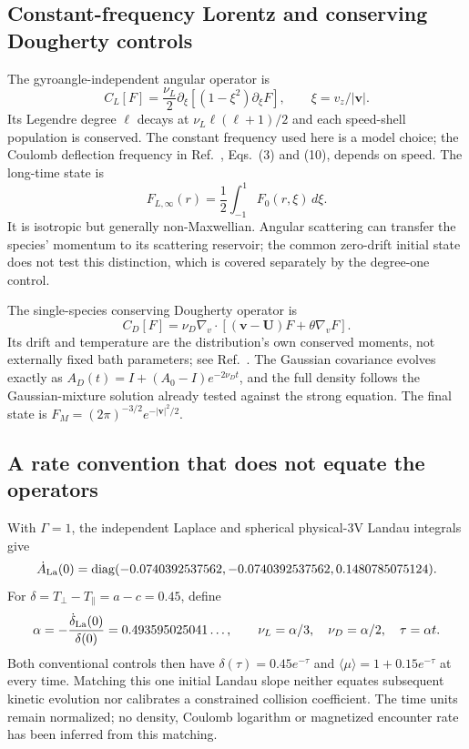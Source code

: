 \documentclass[11pt,letterpaper]{article}
\begin{document}
\subsection{Constant-frequency Lorentz and conserving Dougherty controls}
The gyroangle-independent angular operator is
\[
 C_L[F]=\frac{\nu_L}{2}\partial_\xi[(1-\xi^2)\partial_\xi F],
 \qquad \xi=v_z/|\mathbf v|.
\]
Its Legendre degree $\ell$ decays at
$\nu_L\ell(\ell+1)/2$ and each speed-shell population is conserved.
The constant frequency used here is a model choice; the Coulomb
deflection frequency in Ref.~\cite{ABC09}, Eqs.~(3) and (10), depends on
speed. The long-time state is
\[
 F_{L,\infty}(r)=\frac12\int_{-1}^{1}F_0(r,\xi)\,d\xi.
\]
It is isotropic but generally non-Maxwellian. Angular scattering can
transfer the species' momentum to its scattering reservoir; the common
zero-drift initial state does not test this distinction, which is covered
separately by the degree-one control.

The single-species conserving Dougherty operator is
\[
 C_D[F]=\nu_D\nabla_v\cdot[(\mathbf v-\mathbf U)F+\theta\nabla_vF].
\]
Its drift and temperature are the distribution's own conserved moments,
not externally fixed bath parameters; see Ref.~\cite{HHHH24}.
The Gaussian covariance evolves exactly as
$A_D(t)=I+(A_0-I)e^{-2\nu_Dt}$, and the full density follows the
Gaussian-mixture solution already tested against the strong equation.
The final state is $F_M=(2\pi)^{-3/2}e^{-|\mathbf v|^2/2}$.

\subsection{A rate convention that does not equate the operators}
With $\Gamma=1$, the independent Laplace and spherical physical-3V
Landau integrals give
\[
 \dot A_{\rm La}(0)=\operatorname{diag}
 (-0.0740392537562,-0.0740392537562,0.1480785075124).
\]
For $\delta=T_\perp-T_\parallel=a-c=0.45$, define
\[
 \alpha=-\frac{\dot\delta_{\rm La}(0)}{\delta(0)}
 =0.493595025041\ldots,\qquad
 \nu_L=\alpha/3,\quad\nu_D=\alpha/2,\quad\tau=\alpha t.
\]
Both conventional controls then have
$\delta(\tau)=0.45e^{-\tau}$ and
$\langle\mu\rangle=1+0.15e^{-\tau}$ at every time. Matching this one
initial Landau slope neither equates subsequent kinetic evolution nor
calibrates a constrained collision coefficient. The time units remain
normalized; no density, Coulomb logarithm or magnetized encounter rate
has been inferred from this matching.
\end{document}

